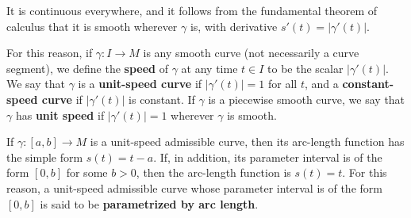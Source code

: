 It is continuous everywhere, and it follows from the fundamental theorem of calculus that it is smooth wherever $\gamma$ is, with derivative $s'(t) = |\gamma'(t)|$.

For this reason, if $\gamma: I \to M$ is any smooth curve (not necessarily a curve segment), we define the \textbf{speed} of $\gamma$ at any time $t \in I$ to be the scalar $|\gamma'(t)|$. We say that $\gamma$ is a \textbf{unit-speed curve} if $|\gamma'(t)| = 1$ for all $t$, and a \textbf{constant-speed curve} if $|\gamma'(t)|$ is constant. If $\gamma$ is a piecewise smooth curve, we say that $\gamma$ has \textbf{unit speed} if $|\gamma'(t)| = 1$ wherever $\gamma$ is smooth.

If $\gamma : [a, b] \to M$ is a unit-speed admissible curve, then its arc-length function has the simple form $s(t) = t - a$. If, in addition, its parameter interval is of the form $[0, b]$ for some $b > 0$, then the arc-length function is $s(t) = t$. For this reason, a unit-speed admissible curve whose parameter interval is of the form $[0, b]$ is said to be \textbf{parametrized by arc length}.

